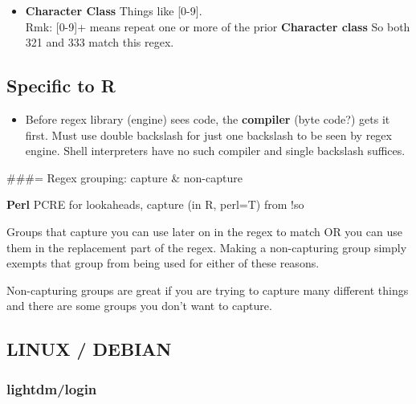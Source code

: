 \documentclass[
]{report}
\providecommand{\tightlist}{%
  \setlength{\itemsep}{0pt}\setlength{\parskip}{0pt}}\usepackage{longtable,booktabs,array}
\begin{document}
\begin{itemize}
\tightlist
\item
  \textbf{Character Class} Things like {[}0-9{]}.\\
  Rmk: {[}0-9{]}+ means repeat one or more of the prior
  \textbf{Character class} So both 321 and 333 match this regex.
\end{itemize}

\subsection{Specific to R}\label{specific-to-r}

\begin{itemize}
\tightlist
\item
  Before regex library (engine) sees code, the \textbf{compiler} (byte
  code?) gets it first. Must use double backslash for just one backslash
  to be seen by regex engine. Shell interpreters have no such compiler
  and single backslash suffices.
\end{itemize}

\#\#\#= Regex grouping: capture \& non-capture

\textbf{Perl} PCRE for lookaheads, capture (in R, perl=T) from !so

Groups that capture you can use later on in the regex to match OR you
can use them in the replacement part of the regex. Making a
non-capturing group simply exempts that group from being used for either
of these reasons.

Non-capturing groups are great if you are trying to capture many
different things and there are some groups you don't want to capture.

\subsection{LINUX / DEBIAN}\label{linux-debian}

\subsubsection{lightdm/login}\label{lightdmlogin}
\end{document}
